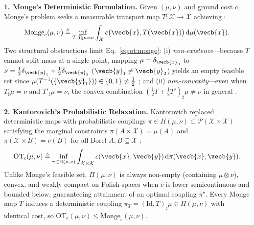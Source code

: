 \documentclass[../../../../master.tex]{subfiles}
\begin{document}
\begin{coremath}
\label{cm:ot:monge_kantorovich}
\textbf{1. Monge's Deterministic Formulation.} Given $(\mu, \nu)$ and ground cost $c$, Monge's problem seeks a measurable transport map $T : \mathcal{X} \to \mathcal{X}$ achieving  :
\begin{equation}
\label{eq:ot:monge}
  \mathrm{Monge}_c(\mu, \nu) \triangleq \inf_{T : T_\sharp \mu = \nu} \int_{\mathcal{X}} c\bigl(\vecb{x}, T(\vecb{x})\bigr)\,\mathrm{d}\mu(\vecb{x}).
\end{equation}
Two structural obstructions limit Eq.~\eqref{eq:ot:monge}: (i) \emph{non-existence}---because $T$ cannot split mass at a single point, mapping $\mu = \delta_{\vecb{x}_0}$ to $\nu = \frac{1}{2}\delta_{\vecb{y}_1} + \frac{1}{2}\delta_{\vecb{y}_2}$ ($\vecb{y}_1 \ne \vecb{y}_2$) yields an empty feasible set since $\mu(T^{-1}(\{\vecb{y}_1\})) \in \{0, 1\} \ne \frac{1}{2}$ ; and (ii) \emph{non-convexity}---even when $T_\sharp \mu = \nu$ and $T'_\sharp \mu = \nu$, the convex combination $(\frac{1}{2}T + \frac{1}{2}T')_\sharp \mu \ne \nu$ in general .

\textbf{2. Kantorovich's Probabilistic Relaxation.} Kantorovich replaced deterministic maps with probabilistic couplings $\pi \in \Pi(\mu, \nu) \subset \mathcal{P}(\mathcal{X} \times \mathcal{X})$ satisfying the marginal constraints $\pi(A \times \mathcal{X}) = \mu(A)$ and $\pi(\mathcal{X} \times B) = \nu(B)$ for all Borel $A, B \subseteq \mathcal{X}$  :
\begin{equation}
\label{eq:ot:kantorovich}
  \mathrm{OT}_c(\mu, \nu) \triangleq \inf_{\pi \in \Pi(\mu, \nu)} \int_{\mathcal{X} \times \mathcal{X}} c(\vecb{x}, \vecb{y})\,\mathrm{d}\pi(\vecb{x}, \vecb{y}).
\end{equation}
Unlike Monge's feasible set, $\Pi(\mu, \nu)$ is always non-empty (containing $\mu \otimes \nu$), convex, and weakly compact on Polish spaces when $c$ is lower semicontinuous and bounded below, guaranteeing attainment of an optimal coupling $\pi^\star$. Every Monge map $T$ induces a deterministic coupling $\pi_T = (\mathrm{Id}, T)_\sharp \mu \in \Pi(\mu, \nu)$ with identical cost, so $\mathrm{OT}_c(\mu, \nu) \le \mathrm{Monge}_c(\mu, \nu)$.


\end{coremath}
\end{document}
